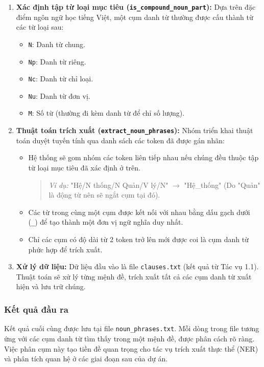 \begin{enumerate}
    \item \textbf{Xác định tập từ loại mục tiêu (\texttt{is\_compound\_noun\_part}):} 
    Dựa trên đặc điểm ngôn ngữ học tiếng Việt, một cụm danh từ thường được cấu thành từ các từ loại sau:
    \begin{itemize}
        \item \texttt{N}: Danh từ chung.
        \item \texttt{Np}: Danh từ riêng.
        \item \texttt{Nc}: Danh từ chỉ loại.
        \item \texttt{Nu}: Danh từ đơn vị.
        \item \texttt{M}: Số từ (thường đi kèm danh từ để chỉ số lượng).
    \end{itemize}

    \item \textbf{Thuật toán trích xuất (\texttt{extract\_noun\_phrases}):} 
    Nhóm triển khai thuật toán duyệt tuyến tính qua danh sách các token đã được gán nhãn:
    \begin{itemize}
        \item Hệ thống sẽ gom nhóm các token liên tiếp nhau nếu chúng đều thuộc tập từ loại mục tiêu đã xác định ở trên.
        \begin{quote}
            \textit{Ví dụ:} "Hệ/N thống/N Quản/V lý/N" $\rightarrow$ "Hệ\_thống" (Do "Quản" là động từ nên sẽ ngắt cụm tại đó).
        \end{quote}
        \item Các từ trong cùng một cụm được kết nối với nhau bằng dấu gạch dưới (\texttt{\_}) để tạo thành một đơn vị ngữ nghĩa duy nhất.
        \item Chỉ các cụm có độ dài từ 2 token trở lên mới được coi là cụm danh từ phức hợp để trích xuất.
    \end{itemize}

    \item \textbf{Xử lý dữ liệu:}
    Dữ liệu đầu vào là file \texttt{clauses.txt} (kết quả từ Tác vụ 1.1). Thuật toán sẽ xử lý từng mệnh đề, trích xuất tất cả các cụm danh từ xuất hiện và lưu trữ chúng.
\end{enumerate}

\subsubsection{Kết quả đầu ra}
Kết quả cuối cùng được lưu tại file \texttt{noun\_phrases.txt}. Mỗi dòng trong file tương ứng với các cụm danh từ tìm thấy trong một mệnh đề, được phân cách rõ ràng. Việc phân cụm này tạo tiền đề quan trọng cho tác vụ trích xuất thực thể (NER) và phân tích quan hệ ở các giai đoạn sau của dự án.
